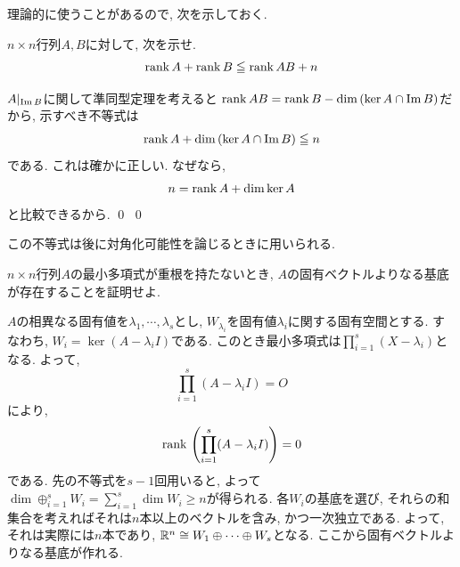 理論的に使うことがあるので, 次を示しておく.
\begin{egprob} \label{egprob:rank_ineq}
$n\times n$行列$A,B$に対して, 次を示せ.
\[\mathrm{rank}\, A + \mathrm{rank}\, B \leqq \mathrm{rank}\, AB + n\]
\end{egprob}
\begin{egans}
$A|_{\mathrm{Im}\,B}$に関して準同型定理を考えると
$\mathrm{rank}\, AB = \mathrm{rank}\, B - \dim{(\ker{A} \cap \mathrm{Im}\,B)} $だから, 示すべき不等式は
\[\mathrm{rank}\, A + \dim{(\ker{A}\cap \mathrm{Im}\,B)} \leqq n\]
である. これは確かに正しい. なぜなら,
\[n = \mathrm{rank}\, A + \dim{\ker{A}}\]
と比較できるから. \qed
\qed
\end{egans}
この不等式は後に対角化可能性を論じるときに用いられる.
\begin{egprob}
$n\times n$行列$A$の最小多項式が重根を持たないとき, $A$の固有ベクトルよりなる基底が存在することを証明せよ.
\end{egprob}

\begin{egans}
$A$の相異なる固有値を$\lambda_1,\cdots, \lambda_s$とし, $W_{\lambda_i}$を固有値$\lambda_i$に関する固有空間とする. すなわち, $W_i = \ker{(A-\lambda_i I)}$である. このとき最小多項式は$\prod_{i=1}^{s}(X-\lambda_i)$となる. よって,
\[\prod_{i=1}^{s} (A-\lambda_i I) = O\]
により,
\[\mathrm{rank}\, \left( \prod_{i=1}^{s} (A-\lambda_i I) \right)= 0\]
である. 先の不等式を$s-1$回用いると,
よって$\dim{\oplus_{i=1}^{s} W_i} = \sum_{i=1}^{s} \dim{W_i} \geq n$が得られる. 各$W_i$の基底を選び, それらの和集合を考えればそれは$n$本以上のベクトルを含み, かつ一次独立である. よって, それは実際には$n$本であり, $\mathbb{R}^{n} \cong W_1\oplus \cdots \oplus W_s$となる. ここから固有ベクトルよりなる基底が作れる.
\end{egans}

